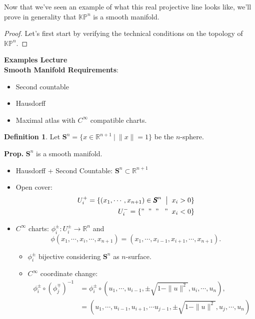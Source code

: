 \documentclass[11pt]{amsart}
\theoremstyle{definition}
\newtheorem{definition}{Definition}
\def\sphere{{\pmb S}}
\def\projspace{{ \mathbb{K}\mathbb{P} }}
\begin{document}
Now that we've seen an example of what this real projective line looks like, we'll prove in generality  that $\projspace^n$ is a smooth manifold.

\begin{proof}
	Let's first start by verifying the technical conditions on the topology of $\projspace^n.$
\end{proof}



\textbf{Examples Lecture} \\


\noindent \textbf{Smooth Manifold Requirements}:
\begin{itemize}
	\item Second countable
	\item Hausdorff
	\item Maximal atlas with $C^{\infty}$ compatible charts.
\end{itemize}
\begin{definition}
	Let $\sphere^n = \{x \in \mathbb{R}^{n+1}\ |\ \|x\| = 1\}$ be the $n$-sphere.
\end{definition}
\textbf{Prop.} $\sphere^n$ is a smooth manifold.
\begin{itemize}
	\item Hausdorff + Second Countable: $\sphere^n \subset \mathbb{R}^{n+1}$

	\item Open cover: 	
	\begin{equation*}
	\begin{aligned}
		U^+_i = \{(x_1, \cdots, x_{n+1})\in \sphere^n\mathrel{}\big|\mathrel{} x_i > 0\} \\
		U^-_i = \{ " \;\; "  \;\; " \;\;\; " \;\; x_i < 0\} \\
	\end{aligned}
	\end{equation*}
	\item $C^{\infty}$ charts: $\phi_i^{\pm}: U_i^{\pm} \to \mathbb{R}^n$ and
	\begin{equation*}
		\phi(x_1, \cdots, x_i, \cdots, x_{n+1}) = (x_1, \cdots, x_{i-1}, x_{i+1}, \cdots, x_{n+1}).
	\end{equation*}
	\begin{itemize}
		\item $\phi^{\pm}_i$  bijective considering $\sphere^n$ as $n$-surface.
		\item $C^{\infty}$ coordinate change:
		\begin{equation*}
	\begin{aligned}
		\phi_i^{\pm}\circ \left(\phi_j^{\mp}\right)^{-1} &= \phi_i^{\pm}\circ  \left( u_1, \cdots, u_{i-1}, \pm \sqrt{1 - \|u\|^2}, u_i, \cdots, u_n\right),\\
		&= \left( u_1, \cdots,u_{i-1},u_{i+1},\cdots  u_{j-1}, \pm \sqrt{1 - \|u\|^2}, u_j, \cdots, u_n\right)
	\end{aligned}
	\end{equation*} 
	\end{itemize}
\end{itemize}
\end{document}

